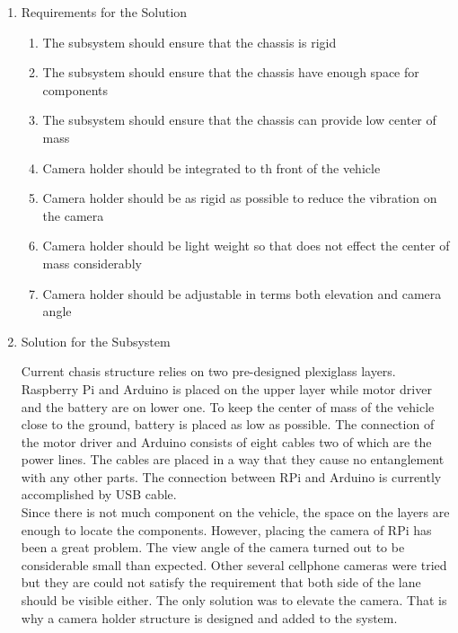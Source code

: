\documentclass[a4paper,12pt]{article}
\begin{document}
\begin{enumerate}

\item {Requirements for the Solution}


\begin{enumerate}

\item The subsystem should ensure that the chassis is rigid 

\item The subsystem should ensure that the chassis have enough space for components

\item The subsystem should ensure that the chassis can provide low center of mass 

\item Camera holder should be integrated to th front of the vehicle

\item Camera holder should be as rigid as possible to reduce the vibration on the camera

\item Camera holder should be light weight so that does not effect the center of mass considerably

\item Camera holder should be adjustable in terms both elevation and camera angle


\end{enumerate}


\item {Solution for the Subsystem}


Current chasis structure relies on two pre-designed plexiglass layers. Raspberry Pi and Arduino is placed on the upper layer while motor driver and the battery are on lower one. To keep the center of mass of the vehicle close to the ground, battery is placed as low as possible. The connection of the motor driver and Arduino consists of eight cables two of which are the power lines. The cables are placed in a way that they cause no entanglement with any other parts. The connection between RPi and Arduino is currently accomplished by USB cable. \\


Since there is not much component on the vehicle, the space on the layers are enough to locate the components. However, placing the camera of RPi has been a great problem. The view angle of the camera turned out to be considerable small than expected. Other several cellphone cameras were tried but they are could not satisfy the requirement that both side of the lane should be visible either. The only solution was to elevate the camera. That is why a camera holder structure is designed and added to the system.\\	



\end{enumerate}
\end{document}
